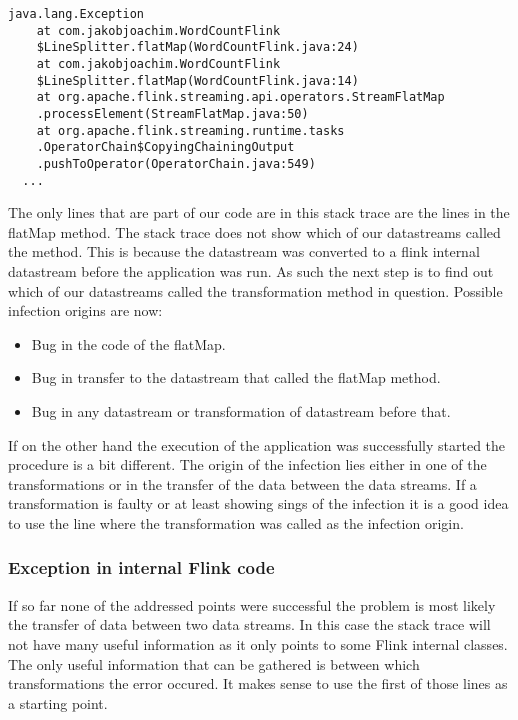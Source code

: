 \begin{lstlisting}
java.lang.Exception
	at com.jakobjoachim.WordCountFlink
    $LineSplitter.flatMap(WordCountFlink.java:24)
	at com.jakobjoachim.WordCountFlink
    $LineSplitter.flatMap(WordCountFlink.java:14)
	at org.apache.flink.streaming.api.operators.StreamFlatMap
    .processElement(StreamFlatMap.java:50)
	at org.apache.flink.streaming.runtime.tasks
    .OperatorChain$CopyingChainingOutput
    .pushToOperator(OperatorChain.java:549)
  ...
\end{lstlisting}

The only lines that are part of our code are in this stack trace are the lines in the flatMap method. The stack trace does not show which of our datastreams called the method. This is because the datastream was converted to a flink internal datastream before the application was run. As such the next step is to find out which of our datastreams called the transformation method in question. Possible infection origins are now:

\begin{itemize}
  \item Bug in the code of the flatMap.
  \item Bug in transfer to the datastream that called the flatMap method.
  \item Bug in any datastream or transformation of datastream before that.
\end{itemize}



 If on the other hand the execution of the application was successfully started the procedure is a bit different. The origin of the infection lies either in one of the transformations or in the transfer of the data between the data streams. If a transformation is faulty or at least showing sings of the infection it is a good idea to use the line where the transformation was called as the infection origin.

\subsubsection{Exception in internal Flink code}
If so far none of the addressed points were successful the problem is most likely the transfer of data between two data streams. In this case the stack trace will not have many useful information as it only points to some Flink internal classes. The only useful information that can be gathered is between which transformations the error occured. It makes sense to use the first of those lines as a starting point.

